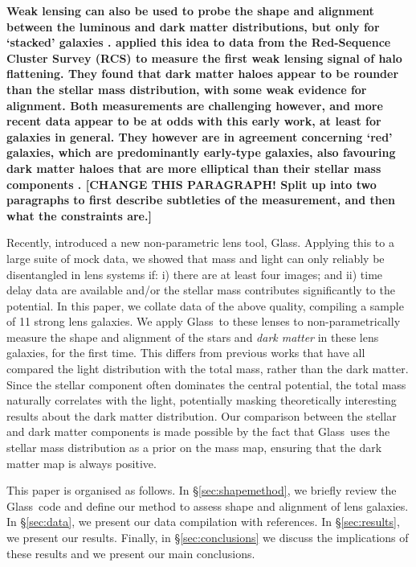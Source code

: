 \documentclass[useAMS,usenatbib]{mn2e}
\def\Glass{{\sc Glass}}
\begin{document}
\textbf{Weak lensing can also be used to probe the shape and alignment between the luminous and dark matter distributions, but only for `stacked' galaxies \citep{2000astro.ph..6281B,2000ApJ...538L.113N}. \citet{2004ApJ...606...67H} applied this idea to data from the Red-Sequence Cluster Survey (RCS) to measure the first weak lensing signal of halo flattening. They found that dark matter haloes appear to be rounder than the stellar mass distribution, with some weak evidence for alignment. Both measurements are challenging however, and more recent data appear to be at odds with this early work, at least for galaxies in general. They however are in agreement concerning `red' galaxies, which are predominantly early-type galaxies, also favouring dark matter haloes that are more elliptical than their stellar mass components \citep{2006MNRAS.370.1008M,2007ApJ...669...21P,2012A&A...545A..71V}. [CHANGE THIS PARAGRAPH! Split up into two paragraphs to first describe subtleties of the measurement, and then what the constraints are.]}

Recently, \cite{2014MNRAS.445.2181C} introduced a new non-parametric lens tool, \Glass. Applying this to a large suite of mock data, we showed that mass and light can only reliably be disentangled in lens systems if: i) there are at least four images; and ii) time delay data are available and/or the stellar mass contributes significantly to the potential. In this paper, we collate data of the above quality, compiling a sample of 11 strong lens galaxies. We apply \Glass\ to these lenses to non-parametrically measure the shape and alignment of the stars and {\it dark matter} in these lens galaxies, for the first time. This differs from previous works that have all compared the light distribution with the total mass, rather than the dark matter. Since the stellar component often dominates the central potential, the total mass naturally correlates with the light, potentially masking theoretically interesting results about the dark matter distribution. Our comparison between the stellar and dark matter components is made possible by the fact that \Glass\ uses the stellar mass distribution as a prior on the mass map, ensuring that the dark matter map is always positive.

This paper is organised as follows. In \S\ref{sec:shapemethod}, we briefly review the \Glass\ code and define our method to assess shape and alignment of lens galaxies. In \S\ref{sec:data}, we present our data compilation with references. In \S\ref{sec:results}, we present our results. Finally, in \S\ref{sec:conclusions} we discuss the implications of these results and we present our main conclusions.
\end{document}
